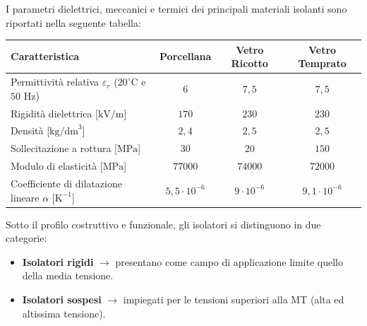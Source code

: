 I parametri dielettrici, meccanici e termici dei principali materiali isolanti sono riportati nella seguente tabella:

\begin{center}
\begin{tabular}{|l|c|c|c|}
\hline
\textbf{Caratteristica} & \textbf{Porcellana} & \textbf{Vetro Ricotto} & \textbf{Vetro Temprato} \\
\hline
Permittività relativa $\varepsilon_r$ ($20^\circ\text{C}$ e $50\text{ Hz}$) & $6$ & $7{,}5$ & $7{,}5$ \\
Rigidità dielettrica [$\text{kV/m}$] & $170$ & $230$ & $230$ \\
Densità [$\text{kg/dm}^3$] & $2{,}4$ & $2{,}5$ & $2{,}5$ \\
Sollecitazione a rottura [$\text{MPa}$] & $30$ & $20$ & $150$ \\
Modulo di elasticità [$\text{MPa}$] & $77000$ & $74000$ & $72000$ \\
Coefficiente di dilatazione lineare $\alpha$ [$\text{K}^{-1}$] & $5{,}5 \cdot 10^{-6}$ & $9 \cdot 10^{-6}$ & $9{,}1 \cdot 10^{-6}$ \\
\hline
\end{tabular}
\end{center}

Sotto il profilo costruttivo e funzionale, gli isolatori si distinguono in due categorie:
\begin{itemize}
    \item \textbf{Isolatori rigidi} $\rightarrow$ presentano come campo di applicazione limite quello della media tensione.
    \item \textbf{Isolatori sospesi} $\rightarrow$ impiegati per le tensioni superiori alla MT (alta ed altissima tensione).
\end{itemize}

